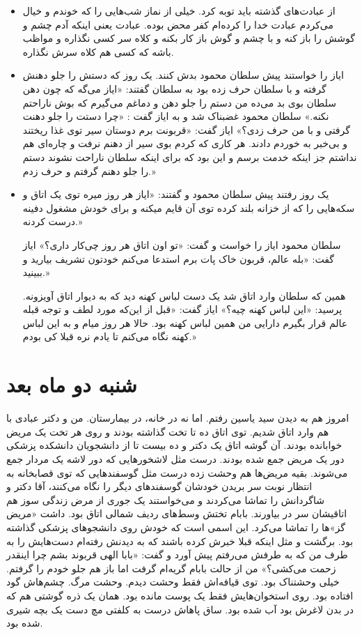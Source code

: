 \documentclass[12pt,a4paper]{book}
\begin{document}
\begin{itemize}

\item از عبادت‌های گذشته باید توبه کرد. خیلی از نماز شب‌هایی را که خوندم و خیال می‌کردم عبادت خدا را کرده‌ام کفر محض بوده. عبادت یعنی اینکه آدم چشم و گوشش را باز کنه و با چشم و گوش باز کار بکنه و کلاه سر کسی نگذاره و مواظب باشه که کسی هم کلاه سرش نگذاره.

\item ایاز را خواستند پیش سلطان محمود بدش کنند. یک روز که دستش را جلو دهنش گرفته و با سلطان حرف زده بود به سلطان گفتند: «ایاز می‌گه که چون دهن سلطان بوی بد می‌ده من دستم را جلو دهن و دماغم می‌گیرم که بوش ناراحتم نکنه.» سلطان محمود غضبناک شد و به ایاز گفت : «چرا دستت را جلو دهنت گرفتی و با من حرف زدی؟» ایاز گفت: «قربونت برم دوستان سیر توی غذا ریختند و بی‌خبر به خوردم دادند. هر کاری که کردم بوی سیر از دهنم نرفت و چاره‌ای هم نداشتم جز اینکه خدمت برسم و این بود که برای اینکه سلطان ناراحت نشوند دستم را جلو دهنم گرفتم و حرف زدم.»

\item یک روز رفتند پیش سلطان محمود و گفتند: «ایاز هر روز میره توی یک اتاق و سکه‌هایی را که از خزانه بلند کرده توی آن قایم میکنه و برای خودش مشغول دفینه درست کردنه.»

سلطان محمود ایاز را خواست و گفت: «تو اون اتاق هر روز چی‌کار داری؟» ایاز گفت: «بله عالم، قربون خاک پات برم استدعا می‌کنم خودتون تشریف بیارید و ببینید.»

همین که سلطان وارد اتاق شد یک دست لباس کهنه دید که به دیوار اتاق آویزونه. پرسید: «این لباس کهنه چیه؟» ایاز گفت: «قبل از این‌که مورد لطف و توجه قبله عالم قرار بگیرم دارایی من همین لباس کهنه بود. حالا هر روز میام و به این لباس کهنه نگاه می‌کنم تا یادم نره قبلا کی بودم.»

\end{itemize}

\chapter{شنبه دو ماه بعد}

امروز هم به دیدن سید یاسین رفتم. اما نه در خانه، در بیمارستان. من و دکتر عبادی با هم وارد اتاق شدیم. توی اتاق ده تا تخت گذاشته بودند و روی هر تخت یک مریض خوابانده بودند. آن گوشه اتاق یک دکتر و ده بیست تا از دانشجویان دانشکده پزشکی دور یک مریض جمع شده بودند. درست مثل لاشخورهایی که دور لاشه یک مردار جمع می‌شوند. بقیه مریض‌ها هم وحشت زده درست مثل گوسفندهایی که توی قصابخانه به انتظار نوبت سر بریدن خودشان گوسفندهای دیگر را نگاه می‌کنند، آقا دکتر و شاگردانش را تماشا می‌کردند و می‌خواستند یک جوری از مرض زندگی سوز هم اتاقیشان سر در بیاورند. بابام تختش وسط‌های ردیف شمالی اتاق بود. داشت «مریض گز»‌ها را تماشا می‌کرد. این اسمی است که خودش روی دانشجوهای پزشکی گذاشته بود. برگشت و مثل اینکه قبلا خبرش کرده باشند که به دیدنش رفته‌ام دست‌هایش را به طرف من که به طرفش می‌رفتم پیش آورد و گفت: «بابا الهی قربوند بشم چرا اینقدر زحمت می‌کشی؟» من از حالت بابام گریه‌ام گرفت اما باز هم جلو خودم را گرفتم.
خیلی وحشتناک بود. توی قیافه‌اش فقط وحشت دیدم.
وحشت مرگ. چشم‌هاش گود افتاده بود. روی استخوان‌هایش فقط یک پوست مانده بود. همان یک ذره گوشتی هم که در بدن لاغرش بود آب شده بود. ساق پاهاش درست به کلفتی مچ دست یک بچه شیری شده بود.
\end{document}
